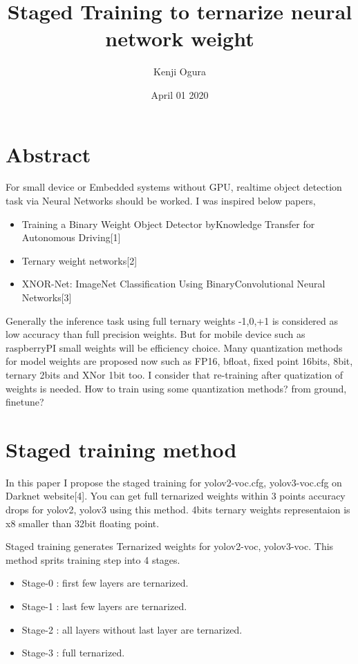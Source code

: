 \documentclass[twocolumn]{article}
\begin{document}
\title{Staged Training to ternarize neural network weight}
\author{Kenji Ogura}
\date{April 01 2020}
\maketitle

\section{Abstract}

For small device or Embedded systems without GPU, realtime object detection task via Neural Networks should be worked.
I was inspired below papers,
\begin{itemize}
\item
 Training a Binary Weight Object Detector byKnowledge Transfer for Autonomous Driving[1]
\item
 Ternary weight networks[2]
\item
 XNOR-Net: ImageNet Classification Using BinaryConvolutional Neural Networks[3]
\end{itemize}

Generally the inference task using full ternary weights -1,0,+1 is considered as low accuracy than full precision weights.
But for mobile device such as raspberryPI small weights will be efficiency choice.
Many quantization methods for model weights are proposed now such as FP16, bfloat, fixed point 16bits, 8bit, ternary 2bits and XNor 1bit too.
I consider that re-training after quatization of weights is needed.
How to train using some quantization methods? from ground, finetune?

\section{Staged training method}
In this paper I propose the staged training for yolov2-voc.cfg, yolov3-voc.cfg on Darknet website[4].
You can get full ternarized weights within 3 points accuracy drops for yolov2, yolov3 using this method.
4bits ternary weights representaion is x8 smaller than 32bit floating point.

Staged training generates Ternarized weights for yolov2-voc, yolov3-voc.
This method sprits training step into 4 stages.

\begin{itemize}
\item Stage-0 : first few layers are ternarized.
\item Stage-1 : last few layers are ternarized.
\item Stage-2 : all layers without last layer are ternarized.
\item Stage-3 : full ternarized.
\end{itemize}
\end{document}
